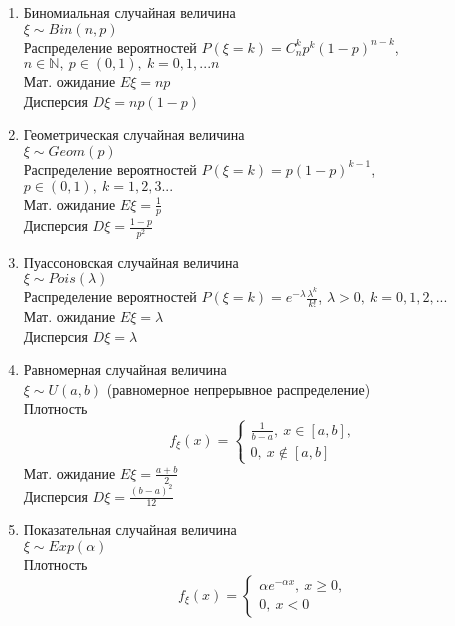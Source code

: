 \documentclass[a4paper, 12pt]{article}
\begin{document}
\begin{enumerate}
    \item Биномиальная случайная величина\\
    $\xi\sim Bin(n,p)$\\
    Распределение вероятностей $P(\xi=k)=C_n^kp^k(1-p)^{n-k}$, $n\in\mathbb{N},\ p\in(0,1),\ k=0,1,...n$\\
    Мат. ожидание $E\xi=np$\\
    Дисперсия $D\xi=np(1-p)$
    \item Геометрическая случайная величина\\
    $\xi\sim Geom(p)$\\
    Распределение вероятностей $P(\xi=k)=p(1-p)^{k-1}$, $p\in (0,1),\ k=1,2,3...$\\
    Мат. ожидание $E\xi=\frac{1}{p}$\\
    Дисперсия $D\xi=\frac{1-p}{p^2}$
    \item Пуассоновская случайная величина\\
    $\xi\sim Pois(\lambda)$\\
    Распределение вероятностей $P(\xi=k)=e^{-\lambda}\frac{\lambda^k}{k!}$, $\lambda>0,\ k=0,1,2,...$\\
    Мат. ожидание $E\xi=\lambda$\\
    Дисперсия $D\xi=\lambda$
    \item Равномерная случайная величина\\
    $\xi\sim U(a,b)$ (равномерное непрерывное распределение)\\
    Плотность
    \begin{equation*}
        f_\xi(x)=
        \begin{cases}
            \frac{1}{b-a},\ x\in[a,b],\\
            0,\ x\not\in[a,b]
        \end{cases}
    \end{equation*}
    Мат. ожидание $E\xi=\frac{a+b}{2}$\\
    Дисперсия $D\xi=\frac{(b-a)^2}{12}$
    \item Показательная случайная величина\\
    $\xi\sim Exp(\alpha)$\\
    Плотность
    \begin{equation*}
        f_\xi(x)=
        \begin{cases}
            \alpha e^{-\alpha x},\ x\geq0,\\
            0,\ x<0
        \end{cases}
    \end{equation*}

\end{enumerate}
\end{document}
